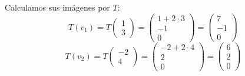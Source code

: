\begin{prob}
\begin{myproof}
Calculamos sus imágenes por $T$:
\[
T(v_1) = T\begin{pmatrix} 1 \\ 3 \end{pmatrix} = \begin{pmatrix} 1 + 2 \cdot 3 \\ -1 \\ 0 \end{pmatrix} = \begin{pmatrix} 7 \\ -1 \\ 0 \end{pmatrix}
\]
\[
T(v_2) = T\begin{pmatrix} -2 \\ 4 \end{pmatrix} = \begin{pmatrix} -2 + 2 \cdot 4 \\ 2 \\ 0 \end{pmatrix} = \begin{pmatrix} 6 \\ 2 \\ 0 \end{pmatrix}
\]


\end{myproof}
\end{prob}
